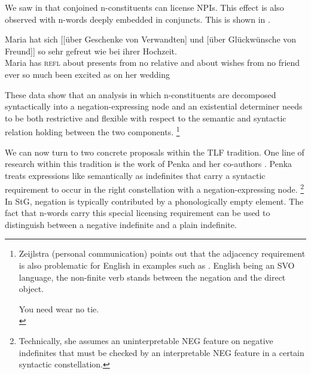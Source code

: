 \documentclass[output=paper]{langsci/langscibook}
\begin{document}
We saw in  that conjoined n-constituents can license NPIs. This effect is also observed with n-words deeply embedded in conjuncts. This is shown in . 

\ea \label{cnnp-kennedy}
\gll Maria hat sich [[über  Geschenke von  Verwandten] und [über Glückwünsche von  Freund]]  so sehr gefreut wie bei ihrer Hochzeit.\\
Maria has \textsc{refl} \hphantom{[[}about presents from no relative and about wishes from no friend ever so much {been excited} as on her wedding\\
\glt {}
\z 

These data show that 
an analysis in which n-constituents are decomposed syntactically into a negation-expressing node and an existential determiner
needs to be both restrictive and flexible with respect to the semantic and syntactic relation holding between the 
two components.%
\footnote{Zeijlstra (personal communication) points out that the adjacency requirement is also problematic for English in examples such as . English being an SVO language, the non-finite verb stands between the negation and the direct object.

\ea \label{no-tie}
You need wear no tie.\\
\z 

}

\medskip%
We can now turn to two concrete proposals within the TLF tradition.
One line of research within this tradition is the work of Penka and her co-authors \citep{Penka:Stechow:01,Penka:Zeijlstra:11,Penka:11,Penka:12}.
Penka treats expressions like  semantically as indefinites that carry a syntactic requirement to occur in the right constellation with
a negation-expressing node.%
\footnote{Technically, she assumes an uninterpretable NEG feature on negative indefinites that must be checked by an interpretable NEG feature in a certain syntactic constellation.} 
In StG, 
negation is typically contributed by a phonologically empty element.
The fact that n-words carry this special licensing requirement  can be used to distinguish between a negative indefinite and a plain indefinite. 
\end{document}
